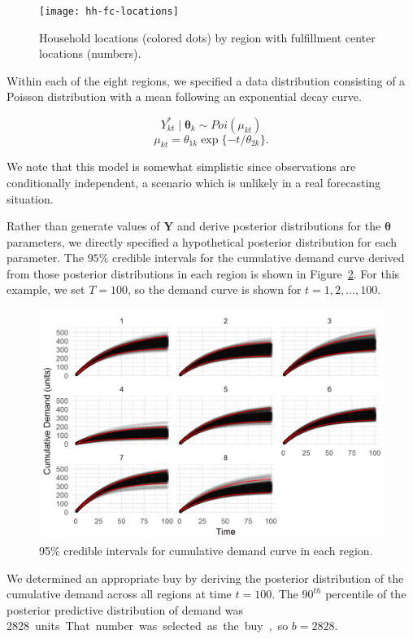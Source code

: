 \documentclass[11pt, oneside]{article}   	%
\begin{document}
\begin{figure}
\centering
\texttt{[image: hh-fc-locations]}
\caption{Household locations (colored dots) by region with fulfillment center locations (numbers).}  \label{fi:hhfclocs}
\end{figure}

Within each of the eight regions, we specified a data distribution consisting of a Poisson distribution with a mean following an exponential decay curve.

$$Y_{kt}^* \mid \boldsymbol{\theta}_{k} \sim Poi(\mu_{kt})$$
$$\mu_{kt} = \theta_{1k} \exp \{ -t / \theta_{2k} \}.$$

\noindent We note that this model is somewhat simplistic since observations are conditionally independent, a scenario which is unlikely in a real forecasting situation.

Rather than generate values of $\mathbf{Y}$ and derive posterior distributions for the $\boldsymbol{\theta}$ parameters, we directly specified a hypothetical posterior distribution for each parameter.  The $95\%$ credible intervals for the cumulative demand curve derived from those posterior distributions in each region is shown in Figure~\ref{fi:demcurve}.  For this example, we set $T = 100$, so the demand curve is shown for $t = 1, 2, \ldots, 100$.

\begin{figure}
\centering
\includegraphics{demand-curve-95pct}
\caption{95\% credible intervals for cumulative demand curve in each region.}  \label{fi:demcurve}
\end{figure}

We determined an appropriate buy by deriving the posterior distribution of the cumulative demand across all regions at time $t = 100$.  The $90^{th}$ percentile of the posterior predictive distribution of demand was \SI{2828} units.  That number was selected as the buy, so $b = 2828$.
\end{document}

